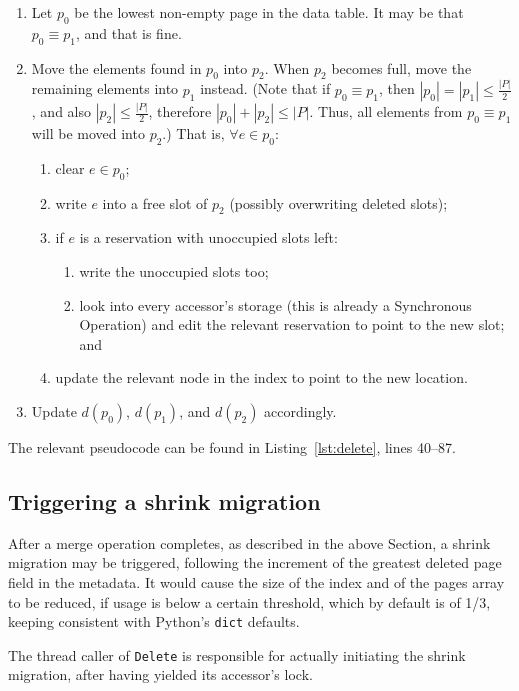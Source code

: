 \begin{enumerate}
	\item Let $p_0$ be the lowest non-empty page in the data table.
	It may be that $p_0 \equiv p_1$, and that is fine.
	\item Move the elements found in $p_0$ into $p_2$.
	When $p_2$ becomes full, move the remaining elements into $p_1$ instead.
	(Note that if $p_0 \equiv p_1$, then $|p_0| = |p_1| \leq \frac{|P|}{2}$, and also $|p_2| \leq \frac{|P|}{2}$, therefore $|p_0| + |p_2| \leq |P|$.
	Thus, all elements from $p_0 \equiv p_1$ will be moved into $p_2$.)
	That is, $\forall e \in p_0$:
	\begin{enumerate}
		\item clear $e \in p_0$;
		\item write $e$ into a free slot of $p_2$ (possibly overwriting deleted slots);
		\item if $e$ is a reservation with unoccupied slots left:
		\begin{enumerate}
			\item write the unoccupied slots too;
			\item look into every accessor's storage (this is already a Synchronous Operation) and edit the relevant reservation to point to the new slot; and
		\end{enumerate}
		\item update the relevant node in the index to point to the new location.
	\end{enumerate}
	\item Update $d(p_0)$, $d(p_1)$, and $d(p_2)$ accordingly.
\end{enumerate}

The relevant pseudocode can be found in Listing~\ref{lst:delete}, lines 40--87.


\subsection{Triggering a shrink migration}\label{subsec:triggering-a-shrink}

After a merge operation completes, as described in the above Section, a shrink migration may be triggered, following the increment of the greatest deleted page field in the metadata.
It would cause the size of the index and of the pages array to be reduced, if usage is below a certain threshold, which by default is of 1/3, keeping consistent with Python's \texttt{dict} defaults.

The thread caller of \texttt{Delete} is responsible for actually initiating the shrink migration, after having yielded its accessor's lock.


